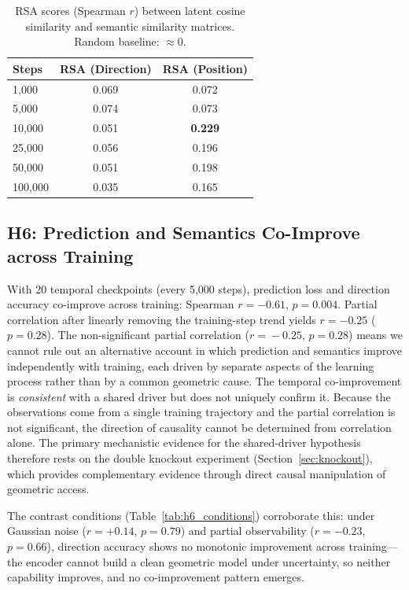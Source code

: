 \documentclass{article}
\begin{document}
\begin{table}[h]
\centering
\caption{RSA scores (Spearman $r$) between latent cosine similarity
         and semantic similarity matrices. Random baseline: $\approx$0.}
\label{tab:rsa}
\begin{tabular}{lcc}
\toprule
Steps & RSA (Direction) & RSA (Position) \\
\midrule
1{,}000   & 0.069 & 0.072 \\
5{,}000   & 0.074 & 0.073 \\
10{,}000  & 0.051 & \textbf{0.229} \\
25{,}000  & 0.056 & 0.196 \\
50{,}000  & 0.051 & 0.198 \\
100{,}000 & 0.035 & 0.165 \\
\bottomrule
\end{tabular}
\end{table}


\subsection{H6: Prediction and Semantics Co-Improve across Training}

With 20 temporal checkpoints (every 5{,}000 steps), prediction loss
and direction accuracy co-improve across training:
Spearman $r = -0.61$, $p = 0.004$.
Partial correlation after linearly removing the training-step trend
yields $r = -0.25$ ($p = 0.28$).
The non-significant partial correlation ($r\!=\!-0.25$, $p\!=\!0.28$)
means we cannot rule out an alternative account in which prediction and
semantics improve independently with training, each driven by separate
aspects of the learning process rather than by a common geometric cause.
The temporal co-improvement is \emph{consistent} with a shared driver
but does not uniquely confirm it.
Because the observations come from a single training trajectory and
the partial correlation is not significant, the direction of causality
cannot be determined from correlation alone.
The primary mechanistic evidence for the shared-driver hypothesis
therefore rests on the double knockout experiment
(Section~\ref{sec:knockout}), which provides complementary evidence
through direct causal manipulation of geometric access.

The contrast conditions (Table~\ref{tab:h6_conditions}) corroborate
this: under Gaussian noise ($r = +0.14$, $p = 0.79$) and
partial observability ($r = -0.23$, $p = 0.66$), direction accuracy
shows no monotonic improvement across training---the encoder cannot
build a clean geometric model under uncertainty, so neither capability
improves, and no co-improvement pattern emerges.
\end{document}
